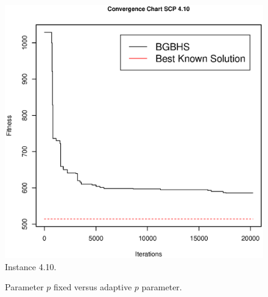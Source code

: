 \begin{figure}[]
\centering
\includegraphics[scale=.45]{Resultados/scp410.eps}
\caption{Instance 4.10.}
\label{fig:Instance.4.10}
\end{figure}

\begin{figure}[htp] 
    \centering
    \hfill%
        \caption{Parameter $p$ fixed versus adaptive $p$ parameter.}
\end{figure}


